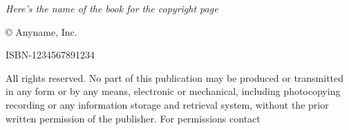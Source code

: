 \null\vfill
\begin{flushleft}
\thispagestyle{empty}
\textit{Here's the name of the book for the copyright page}

© Anyname, Inc.

ISBN-1234567891234

\noindent All rights reserved. No part of this publication may be produced or transmitted in any form or by any means, electronic or mechanical, including photocopying recording or any information storage and retrieval system, without the prior written permission of the publisher. For permissions contact
\end{flushleft}
